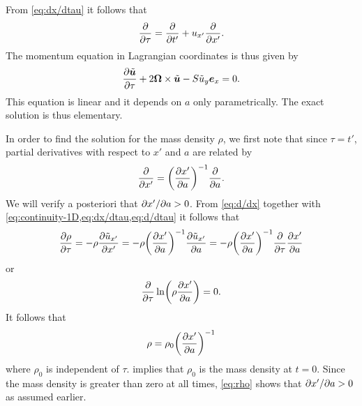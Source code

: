 \documentclass[aps,pre,notitlepage,amsmath,amssymb,amsfonts,nobibnotes,nofootinbib,superscriptaddress,onecolumn,a4paper,10pt]{revtex4-1}
\newcommand{\tvec}[1]{\tilde{\vec{#1}}}
\begin{document}
From \cref{eq:dx/dtau} it follows that
\begin{equation}
  \label{eq:d/dtau}
  \frac{\partial}{\partial\tau} = \frac{\partial}{\partial t'} + u_{x'}\frac{\partial}{\partial x'}.
\end{equation}
The momentum equation  in Lagrangian coordinates is
thus given by
\begin{equation}
  \label{eq:momentum-lagrangian}
  \pder{\tvec{u}}{\tau} + 2\vec{\Omega}\times\tvec{u} - S\tilde{u}_y\ex = 0.
\end{equation}
This equation is linear and it depends on $a$ only parametrically. The exact
solution is thus elementary.

In order to find the solution for the mass density $\rho$, we first note that
since $\tau=t'$, partial derivatives with respect to $x'$ and $a$ are related
by
\begin{equation}
  \label{eq:d/dx}
  \pder{}{x'} = \left(\pder{x'}{a}\right)^{-1}\pder{}{a}.
\end{equation}
We will verify a posteriori that $\partial{x'}/\partial{a}>0$. From \cref{eq:d/dx}
together with \cref{eq:continuity-1D,eq:dx/dtau,eq:d/dtau} it follows that
\begin{equation}
  \pder{\rho}{\tau} = -\rho\pder{\tilde{u}_{x'}}{x'} =
  -\rho\left(\pder{x'}{a}\right)^{-1}\pder{\tilde{u}_{x'}}{a} =
  -\rho\left(\pder{x'}{a}\right)^{-1}\pder{}{\tau}\pder{x'}{a}
\end{equation}
or
\begin{equation}
  \pder{}{\tau}\ln\left(\rho\pder{x'}{a}\right) = 0.
\end{equation}
It follows that
\begin{equation}
  \label{eq:rho}
  \rho = \rho_0\left(\pder{x'}{a}\right)^{-1}
\end{equation}
where $\rho_0$ is independent of $\tau$.  implies that
$\rho_0$ is the mass density at $t=0$. Since the mass density is greater than
zero at all times, \cref{eq:rho} shows that $\partial{x'}/\partial{a}>0$ as assumed
earlier.
\end{document}
